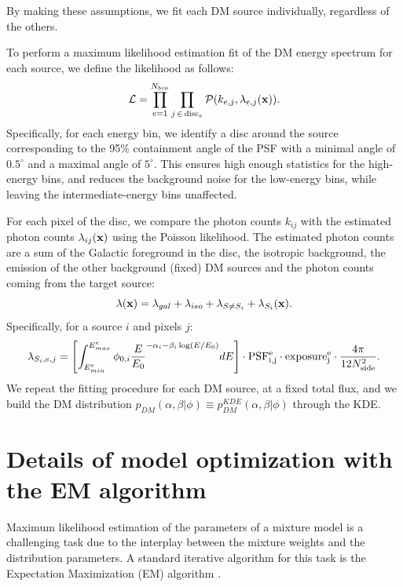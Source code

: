 \documentclass[12pt, a4paper]{article}
\newcommand{\bx}{{\bf x}}
\begin{document}
By making these assumptions, we fit each DM source individually, regardless of the others.

To perform a maximum likelihood estimation fit of the DM energy spectrum for each source, we define the likelihood as follows:
\begin{equation}
    \mathcal{L} = \prod_{e=1}^{N_{bin}} \prod_{j \, \in \, {\rm disc}_e}  
    \mathcal{P}(k_{e,j}, \lambda_{e,j}(\bx)).
\end{equation}
Specifically, for each energy bin, we identify a disc around the source corresponding to the 95\% containment angle of the PSF with a minimal angle of $0.5^\circ$ and a maximal angle of $5^\circ$.
This ensures high enough statistics for the high-energy bins, and reduces the background noise for the low-energy bins, while leaving the intermediate-energy bins unaffected. 


For each pixel of the disc, we compare the photon counts $k_{ij}$ with the estimated photon counts $\lambda_{ij}(\bx)$ using the Poisson likelihood. The estimated photon counts are a sum of the Galactic foreground in the disc, the isotropic background, the emission of the other background (fixed) DM sources and the photon counts coming from the target source:
\begin{equation}
    \lambda(\bx) = \lambda_{gal} + \lambda_{iso} + \lambda_{S \neq S_i} + \lambda_{S_i}(\bx).
\end{equation}
Specifically, for a source $i$ and pixels $j$:
\begin{equation}
    \lambda_{S_i, e,j} = \left[\int_{E_{min}^e}^{E_{max}^e} \phi_{0,i}\frac{E}{E_0}^{-\alpha_i - \beta_i\log(E/E_0)} dE\right] \cdot {\rm PSF_{i,j}^e} \cdot {\rm exposure_{j}^e} \cdot \frac{4\pi}{12 N_{\rm side}^2}.
    \label{eq:lambda}
\end{equation}
We repeat the fitting procedure for each DM source, at a fixed total flux, and we build the DM distribution $p_{DM}(\alpha, \beta|\phi)\equiv p_{DM}^{KDE}(\alpha, \beta|\phi)$ through the KDE.

\section{Details of model optimization with the EM algorithm}
\label{app:EM}

Maximum likelihood estimation of the parameters of a mixture model is a challenging task due to the interplay between the mixture weights and the distribution parameters. 
A standard iterative algorithm for this task is the  Expectation Maximization (EM) algorithm \cite{bishop, hastie2009elements}. 
\end{document}

